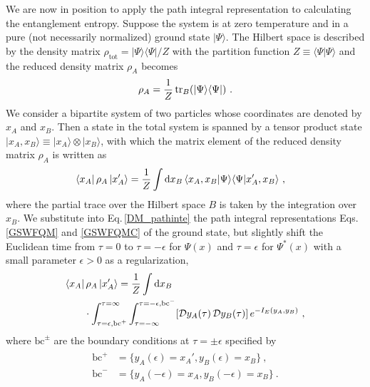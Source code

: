 We are now in position to apply the path integral representation to calculating the entanglement entropy.
Suppose the system is at zero temperature and in a pure (not necessarily normalized) ground state $|\Psi\rangle$.
The Hilbert space is described by the density matrix $\rho_\text{tot} = |\Psi\rangle\langle \Psi | / Z$ with the partition function $Z\equiv \langle \Psi | \Psi\rangle$ and the reduced density matrix $\rho_A$ becomes
\begin{align}\label{RedDM}
\rho_A = \frac{1}{Z}\,{\rm tr}_B (|\Psi\rangle \langle \Psi |) \ .
\end{align}
We consider a bipartite system of two particles whose coordinates are denoted by $x_A$ and $x_B$.
Then a state in the total system is spanned by a tensor product state $|x_A, x_B\rangle \equiv |x_A\rangle\otimes |x_B\rangle$, with which
the matrix element of the reduced density matrix $\rho_A$ is written as
\begin{align}\label{DM_pathinte}
\begin{aligned}
	\langle x_A| \,\rho_A\, |x_A' \rangle &= \frac{1}{Z} \int \mathrm{d} x_B\, \langle x_A, x_B |\Psi\rangle \langle \Psi |x_A', x_B\rangle \ ,
\end{aligned}
\end{align}
where the partial trace over the Hilbert space $B$ is taken by the integration over $x_B$.
We substitute into Eq.\,\eqref{DM_pathinte} the path integral representations Eqs.\,\eqref{GSWFQM} and \eqref{GSWFQMC} of the ground state, but slightly shift the Euclidean time from $\tau = 0$ to $\tau = -\epsilon$ for $\Psi(x)$ and $\tau = \epsilon$ for $\Psi^\ast(x)$ with a small parameter $\epsilon>0$ as a regularization,
\begin{align}
\begin{aligned}
	\langle x_A| &\,\rho_A\, |x_A' \rangle 
		= \frac{1}{Z} \int \mathrm{d} x_B\\ 
		& \cdot \int_{\tau=\epsilon, \text{bc}^+}^{\tau=\infty}\int^{\tau=-\epsilon, \text{bc}^-}_{\tau=-\infty} [{\cal D} y_A(\tau)\,{\cal D} y_B(\tau)]\, e^{- I_E (y_A, y_B)} \ ,
\end{aligned}
\end{align}
where $\text{bc}^\pm$ are the boundary conditions at $\tau = \pm \epsilon$ specified by
\begin{align}
\begin{aligned}
	\text{bc}^+ &=\{ y_A(\epsilon) = x_A', y_B(\epsilon) = x_B\} \ , \\
	\text{bc}^- &= \{y_A(-\epsilon) = x_A, y_B(-\epsilon) = x_B \}\ .
\end{aligned}
\end{align}
